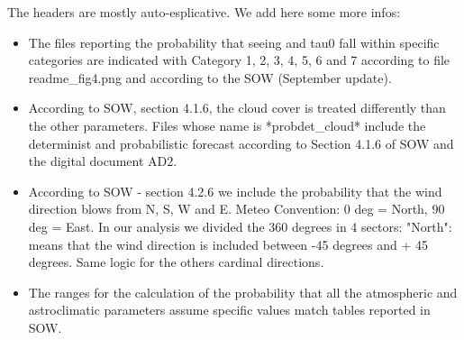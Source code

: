 The headers are mostly auto-esplicative.
%
We add here some more infos:
%
\begin{itemize}
\item  The files reporting the probability that seeing and tau0 fall within specific categories are indicated with Category 1, 2, 3, 4, 5, 6 and 7 according to file readme\_fig4.png and according to the SOW (September update).
\item According to SOW, section 4.1.6, the cloud cover is treated differently than the other parameters. Files whose name is *probdet\_cloud* include the determinist and probabilistic forecast according to Section 4.1.6 of SOW and the digital document AD2.
\item According to SOW - section 4.2.6 we include the probability that the wind direction blows from N, S, W and E. Meteo Convention: 0 deg = North, 90 deg = East. In our analysis we divided the 360 degrees in 4 sectors: "North": means that the wind direction is included between -45 degrees and + 45 degrees. Same logic for the others cardinal directions. 
\item  The ranges for the calculation of the probability that all the atmospheric and astroclimatic parameters assume specific values match tables reported in SOW.
\end{itemize}

